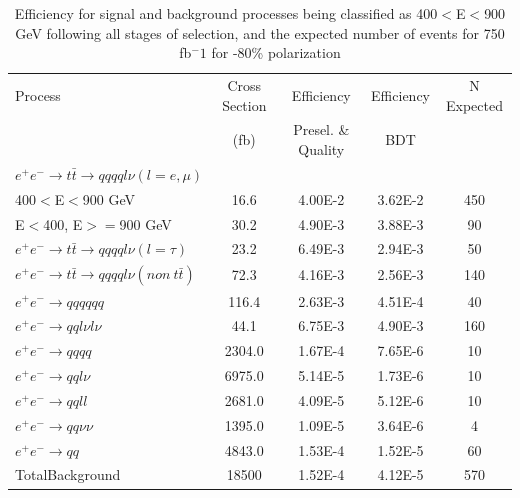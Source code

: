 \begin{table}
  \centering
  \begin{tabular}{l | c | c | c | c}
    \toprule
     Process     & Cross Section & Efficiency & Efficiency & N Expected\\
     & (fb) & Presel. \& Quality & BDT & \\
     \midrule
    $e^+e^-\rightarrow t\bar{t} \rightarrow qqqql\nu (l=e,\mu)$&  &  & &\\
    400$<$E$<$900 GeV & 16.6 & 4.00E-2 & 3.62E-2 & 450\\
    E$<$400, E$>=$900 GeV & 30.2 & 4.90E-3 & 3.88E-3 & 90\\
    \midrule
    $e^+e^-\rightarrow t\bar{t} \rightarrow qqqql\nu (l=\tau)$& 23.2 & 6.49E-3 & 2.94E-3 & 50 \\
    \midrule
    $e^+e^-\rightarrow t\bar{t} \rightarrow qqqql\nu (non ~ t\bar{t})$& 72.3 & 4.16E-3 & 2.56E-3 & 140\\
    \midrule
    $e^+e^-\rightarrow qqqqqq$ & 116.4 & 2.63E-3 & 4.51E-4 & 40 \\
    \midrule
    $e^+e^-\rightarrow qql\nu l\nu$ & 44.1 & 6.75E-3 & 4.90E-3 & 160\\
    \midrule
    $e^+e^-\rightarrow qqqq$ & 2304.0 & 1.67E-4 & 7.65E-6 & 10 \\
    \midrule
    $e^+e^-\rightarrow qql\nu$ & 6975.0 & 5.14E-5 & 1.73E-6 & 10 \\
    \midrule
    $e^+e^-\rightarrow qqll$ & 2681.0 & 4.09E-5 & 5.12E-6 & 10 \\
    \midrule
    $e^+e^-\rightarrow qq\nu\nu$ & 1395.0 & 1.09E-5 & 3.64E-6 & 4 \\
    \midrule
    $e^+e^-\rightarrow qq$ & 4843.0 & 1.53E-4 & 1.52E-5 & 60\\
    \midrule
    \midrule
    TotalBackground & 18500 & 1.52E-4 & 4.12E-5 & 570  \\
    \bottomrule
  \end{tabular}
  \caption{Efficiency for signal and background processes being classified as 400$<$E$<$900 GeV following all stages of selection, and the expected number of events for 750 fb$^-1$ for -80\% polarization}
  \label{table:topfinalefficienciesnegLowE}
\end{table}

